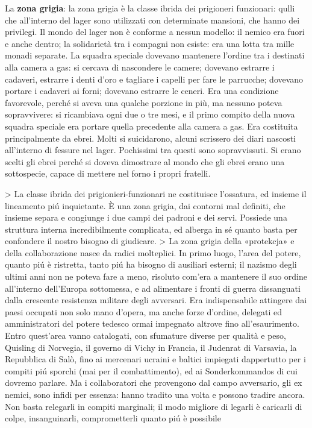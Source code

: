 La \textbf{zona grigia}: la zona grigia è la classe ibrida dei prigioneri funzionari: qulli che all'interno del lager sono utilizzati con determinate mansioni, che hanno dei privilegi. Il mondo del lager non è conforme a nessun modello: il nemico era fuori e anche dentro; la solidarietà tra i compagni non esiste: era una lotta tra mille monadi separate.
La squadra speciale dovevano mantenere l'ordine tra i destinati alla camera a gas: si cercava di nascondere le camere; dovevano estrarre i cadaveri, estrarre i denti d'oro e tagliare i capelli per fare le parrucche; dovevano portare i cadaveri ai forni; dovevano estrarre le ceneri.
Era una condizione favorevole, perché si aveva una qualche porzione in più, ma nessuno poteva sopravvivere: si ricambiava ogni due o tre mesi, e il primo compito della nuova squadra speciale era portare quella precedente alla camera a gas. Era costituita principalmente da ebrei. Molti si suicidarono, alcuni scrissero dei diari nascosti all'interno di fessure nel lager. Pochissimi tra questi sono sopravvissuti.
Si erano scelti gli ebrei perché si doveva dimostrare al mondo che gli ebrei erano una sottospecie, capace di mettere nel forno i propri fratelli.

> La classe ibrida dei prigionieri-funzionari ne costituisce l’ossatura, ed insieme il lineamento piú inquietante. È una zona grigia, dai contorni mal definiti, che insieme separa e congiunge i due campi dei padroni e dei servi. Possiede una struttura interna incredibilmente complicata, ed alberga in sé quanto basta per confondere il nostro bisogno di giudicare.
> La zona grigia della «protekcja» e della collaborazione nasce da radici molteplici. In primo luogo, l’area del potere, quanto piú è ristretta, tanto piú ha bisogno di ausiliari esterni; il nazismo degli ultimi anni non ne poteva fare a meno, risoluto com’era a mantenere il suo ordine all’interno dell’Europa sottomessa, e ad alimentare i fronti di guerra dissanguati dalla crescente resistenza militare degli avversari. Era indispensabile attingere dai paesi occupati non solo mano d’opera, ma anche forze d’ordine, delegati ed amministratori del potere tedesco ormai impegnato altrove fino all’esaurimento. Entro quest’area vanno catalogati, con sfumature diverse per qualità e peso, Quisling di Norvegia, il governo di Vichy in Francia, il Judenrat di Varsavia, la Repubblica di Salò, fino ai mercenari ucraini e baltici impiegati dappertutto per i compiti piú sporchi (mai per il combattimento), ed ai Sonderkommandos di cui dovremo parlare. Ma i collaboratori che provengono dal campo avversario, gli ex nemici, sono infidi per essenza: hanno tradito una volta e possono tradire ancora. Non basta relegarli in compiti marginali; il modo migliore di legarli è caricarli di colpe, insanguinarli, comprometterli quanto piú è possibile

